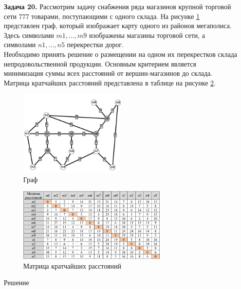 \documentclass{article}
\begin{document}
\clearpage%
\begin{enumerate}
\item[\textbf{Задача 20.}]Рассмотрим задачу снабжения ряда магазинов крупной торговой сети $777$ товарами, поступающими с одного склада. На рисунке \ref{fig:20_graph} представлен граф, который изображает карту одного из районов мегаполиса. Здесь символами $m1, \dots, m9$ изображены магазины торговой сети, а символами $n1, \dots, n5$ \quad\textemdash\quad перекрестки дорог.\\
Необходимо принять решение о размещении на одном их
перекрестков склада непродовольственной продукции. Основным критерием является минимизация суммы всех расстояний от вершин-магазинов до склада. Матрица кратчайших расстояний представлена в таблице на рисунке \ref{fig:20_matrix}.\\
\begin{figure}[ht]
    \centering
    \includegraphics[width=0.5\textwidth, center]{attachments/20/graph.png}
    \caption{Граф}
    \label{fig:20_graph}
\end{figure}
\begin{figure}[ht]
    \centering
    \includegraphics[width=0.7\textwidth, center]{attachments/20/matrix.png}
    \caption{Матрица кратчайших расстояний}
    \label{fig:20_matrix}
\end{figure}
\begin{center}
Решение 
\end{center}


\end{enumerate}
\end{document}
